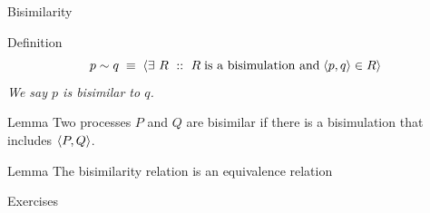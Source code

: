 \documentclass[aspectratio=169]{beamer}
\begin{document}
\begin{slide}{Bisimilarity}
\small

\begin{block}{Definition}
\centering
\[p \sim q\; \equiv\; \rcb{\exists}{R}{}{R\; \text{is a bisimulation and}\; \pair{p,q} \in R} 
\]
\emph{We say \alert{$p$ is bisimilar to $q$}.}
\end{block}


\begin{block}{Lemma}
\centering
Two processes $P$ and $Q$ are bisimilar if there is a bisimulation that includes $\langle P,Q \rangle$.
\end{block}

\begin{block}{Lemma}
The bisimilarity relation is an equivalence relation\\
\end{block}



\end{slide}



\begin{slide}{Exercises}


\end{slide}
\end{document}
